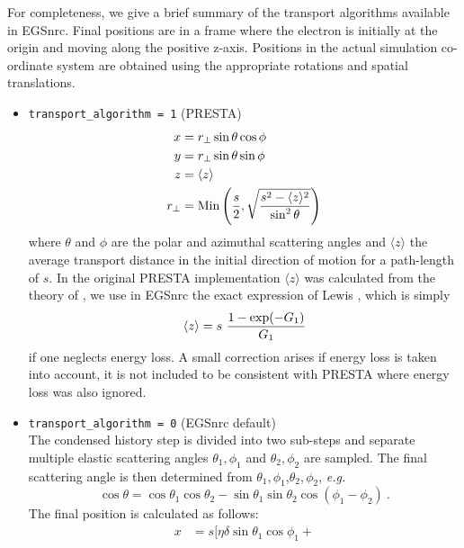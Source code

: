 For completeness, we give a brief summary of the transport 
algorithms available in EGSnrc. Final positions are in a frame 
where the electron is initially at the origin and moving 
along the positive z-axis. Positions in the actual simulation 
co-ordinate system are obtained using the appropriate 
rotations and spatial translations.
\begin{itemize}
\item
{\tt trans\-port\_algo\-rithm = 1} (PRESTA)
\begin{equation}
\label{PRESTA}
\begin{split}
x &= r_\perp \sin \theta \cos \phi \\
y &= r_\perp \sin \theta \sin \phi \\
z &= \langle z \rangle \\
r_\perp &= \mbox{Min}\left({s \over 2},\sqrt{{s^2 - \langle z \rangle^2 \over 
\sin^2 \theta}} \right)
\end{split}
\end{equation}
where $\theta$ and $\phi$ are the polar and azimuthal scattering 
angles and $\langle z \rangle$ the average transport distance 
in the initial direction of motion for a path-length of $s$. 
In the original PRESTA implementation $\langle z \rangle$ 
was calculated from the theory of \Mol, we use in EGSnrc the 
exact expression of Lewis \cite{Le50}, which is simply
\begin{equation}
\langle z \rangle = s~{1 - \exp(-G_1) \over G_1}
\end{equation}
if one neglects energy loss. A small correction arises 
if energy loss is taken into account, it is not included 
to be consistent with PRESTA where energy loss was also ignored.
\item {\tt trans\-port\_algo\-rithm = 0} (EGSnrc default) \hfill \\
The condensed history step is divided into two sub-steps and  
separate multiple elastic scattering angles $\theta_1,\phi_1$ and 
$\theta_2,\phi_2$ are sampled. The final scattering angle 
is then determined from $\theta_1,\phi_1$,$\theta_2,\phi_2$, {\em e.g.}
\begin{equation}
\cos \theta = \cos \theta_1 \cos \theta_2 - \sin \theta_1 \sin \theta_2 
\cos(\phi_1 - \phi_2)~.
\end{equation}
The final position is calculated as follows:
\begin{equation}
\label{egsnrc_algorithm}
\begin{split}
x & = s \Big[ \eta \delta \sin \theta_1 \cos \phi_1 +

\end{split}
\end{equation}
\end{itemize}
